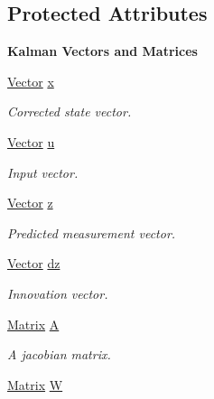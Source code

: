 \subsection*{Protected Attributes}
\begin{Indent}\textbf{ Kalman Vectors and Matrices}\par
\begin{DoxyCompactItemize}
\item 
\mbox{\hyperlink{classKalman_1_1EKFilter_af773d1217ecb01925b857d49b32bc636}{Vector}} \mbox{\hyperlink{classKalman_1_1EKFilter_abc9456e14fd29b7c82ad901ab3e4e63f}{x}}
\begin{DoxyCompactList}\small\item\em Corrected state vector. \end{DoxyCompactList}\item 
\mbox{\hyperlink{classKalman_1_1EKFilter_af773d1217ecb01925b857d49b32bc636}{Vector}} \mbox{\hyperlink{classKalman_1_1EKFilter_ad4403db2f52f9a47cd9f432fc44e0a5d}{u}}
\begin{DoxyCompactList}\small\item\em Input vector. \end{DoxyCompactList}\item 
\mbox{\hyperlink{classKalman_1_1EKFilter_af773d1217ecb01925b857d49b32bc636}{Vector}} \mbox{\hyperlink{classKalman_1_1EKFilter_a91baacb49f7fae74c449c1d21424f126}{z}}
\begin{DoxyCompactList}\small\item\em Predicted measurement vector. \end{DoxyCompactList}\item 
\mbox{\hyperlink{classKalman_1_1EKFilter_af773d1217ecb01925b857d49b32bc636}{Vector}} \mbox{\hyperlink{classKalman_1_1EKFilter_af1976aeb370c1741133bf47528ff8e03}{dz}}
\begin{DoxyCompactList}\small\item\em Innovation vector. \end{DoxyCompactList}\item 
\mbox{\hyperlink{classKalman_1_1EKFilter_a7cbc4cb4d9139a7f241b27110426af43}{Matrix}} \mbox{\hyperlink{classKalman_1_1EKFilter_a5d936cd96a598b5d8534aeb474012c5a}{A}}
\begin{DoxyCompactList}\small\item\em A jacobian matrix. \end{DoxyCompactList}\item 
\mbox{\hyperlink{classKalman_1_1EKFilter_a7cbc4cb4d9139a7f241b27110426af43}{Matrix}} \mbox{\hyperlink{classKalman_1_1EKFilter_a3a50c13fef614d595d01afa70184db84}{W}}

\end{DoxyCompactItemize}
\end{Indent}
